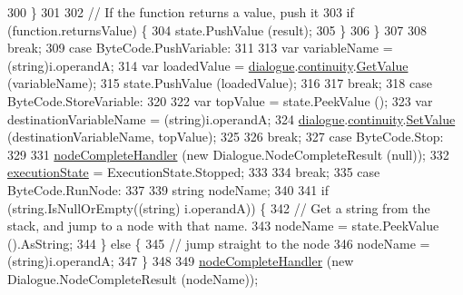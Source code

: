 \begin{DoxyCode}
300                     \}
301 
302                     \textcolor{comment}{// If the function returns a value, push it}
303                     \textcolor{keywordflow}{if} (\textcolor{keyword}{function}.returnsValue) \{
304                         state.PushValue (result);
305                     \}
306                 \}
307 
308                 \textcolor{keywordflow}{break};
309             \textcolor{keywordflow}{case} ByteCode.PushVariable:
311 
313                 var variableName = (string)i.operandA;
314                 var loadedValue = \hyperlink{a00156_ac506426c503da5f033247c29e11c5e82}{dialogue}.\hyperlink{a00086_ae94eaa4b03b432422f5d205fabe37ff5}{continuity}.\hyperlink{a00184_accab1fc5c8fc353dbfc53ca0f4029576}{GetValue} (variableName);
315                 state.PushValue (loadedValue);
316 
317                 \textcolor{keywordflow}{break};
318             \textcolor{keywordflow}{case} ByteCode.StoreVariable:
320 
322                 var topValue = state.PeekValue ();
323                 var destinationVariableName = (string)i.operandA;
324                 \hyperlink{a00156_ac506426c503da5f033247c29e11c5e82}{dialogue}.\hyperlink{a00086_ae94eaa4b03b432422f5d205fabe37ff5}{continuity}.\hyperlink{a00184_aa90ff61224432c5ed3ce72199c55f440}{SetValue} (destinationVariableName, topValue);
325 
326                 \textcolor{keywordflow}{break};
327             \textcolor{keywordflow}{case} ByteCode.Stop:
329 
331                 \hyperlink{a00156_a5129c63e67e2d4e2780d86b8351320a2}{nodeCompleteHandler} (\textcolor{keyword}{new} Dialogue.NodeCompleteResult (null));
332                 \hyperlink{a00156_a66491da06023dabfb63d09e6ccbba74f}{executionState} = ExecutionState.Stopped;
333 
334                 \textcolor{keywordflow}{break};
335             \textcolor{keywordflow}{case} ByteCode.RunNode:
337 
339                 \textcolor{keywordtype}{string} nodeName;
340 
341                 \textcolor{keywordflow}{if} (\textcolor{keywordtype}{string}.IsNullOrEmpty((\textcolor{keywordtype}{string}) i.operandA)) \{
342                     \textcolor{comment}{// Get a string from the stack, and jump to a node with that name.}
343                      nodeName = state.PeekValue ().AsString;
344                 \} \textcolor{keywordflow}{else} \{
345                     \textcolor{comment}{// jump straight to the node}
346                     nodeName = (string)i.operandA;
347                 \}
348 
349                 \hyperlink{a00156_a5129c63e67e2d4e2780d86b8351320a2}{nodeCompleteHandler} (\textcolor{keyword}{new} Dialogue.NodeCompleteResult (nodeName));

\end{DoxyCode}
